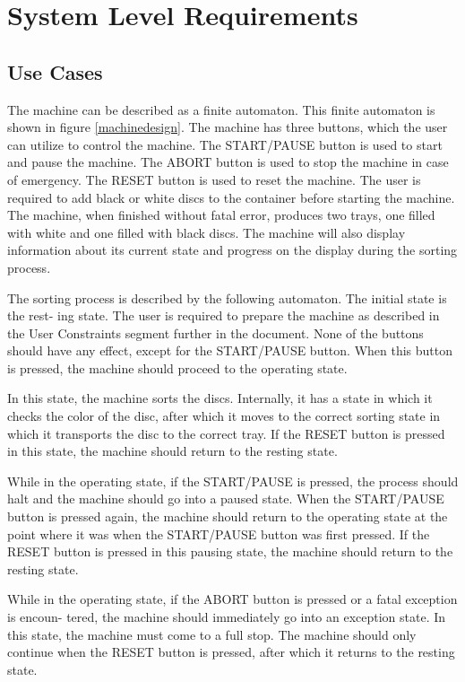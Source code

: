 \documentclass[a4paper,oneside,11pt]{article}
\begin{document}
\section{System Level Requirements}
\subsection{Use Cases}
The machine can be described as a finite automaton. This finite automaton is shown in figure \ref{machinedesign}. The machine has three buttons, which the user can utilize to control the machine. The
START/PAUSE button is used to start and pause the machine. The ABORT button is used to
stop the machine in case of emergency. The RESET button is used to reset the machine. The
user is required to add black or white discs to the container before starting the machine.
The machine, when finished without fatal error, produces two trays, one filled with white
and one filled with black discs. The machine will also display information about its current
state and progress on the display during the sorting process.

The sorting process is described by the following automaton. The initial state is the rest-
ing state. The user is required to prepare the machine as described in the User Constraints segment further in the document. None of the buttons should have any effect, except for the
START/PAUSE button. When this button is pressed, the machine should proceed to the
operating state.

In this state, the machine sorts the discs. Internally, it has a state in which it checks the
color of the disc, after which it moves to the correct sorting state in which it transports the disc
to the correct tray. If the RESET button is pressed in this state, the machine should return to
the resting state.

While in the operating state, if the START/PAUSE is pressed, the process should halt
and the machine should go into a paused state. When the START/PAUSE button is pressed
again, the machine should return to the operating state at the point where it was when the
START/PAUSE button was first pressed. If the RESET button is pressed in this pausing state,
the machine should return to the resting state.

While in the operating state, if the ABORT button is pressed or a fatal exception is encoun-
tered, the machine should immediately go into an exception state. In this state, the machine
must come to a full stop. The machine should only continue when the RESET button is pressed,
after which it returns to the resting state.
\end{document}
